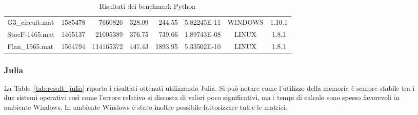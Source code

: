 \documentclass[a4paper, 12pt]{article}
\begin{document}
\begin{table}[h]
{\begin{tabular}{@{}lrrrrrcc@{}}
                    G3\_circuit.mat     & 1585478 & 7660826   & 328.09 & 244.55  & 5.82245E-11 & WINDOWS & 1.10.1 \\
                    StocF-1465.mat      & 1465137 & 21005389  & 376.75 & 739.66  & 1.89743E-08 & LINUX   & 1.8.1  \\
                    Flan\_1565.mat      & 1564794 & 114165372 & 447.43 & 1893.95 & 5.33502E-10 & LINUX   & 1.8.1  \\ \bottomrule
                    \end{tabular}%
                    }
                    \caption{Risultati dei benchmark Python}
                    \label{tab:result_python}
                \end{table}
            
                \subsubsection{Julia}
                La Table~\ref{tab:result_julia} riporta i risultati ottenuti utilizzando Julia. Si può notare come
                l'utilizzo della memoria è sempre stabile tra i due sistemi operativi così come l'errore 
                relativo si discosta di valori poco significativi, ma i tempi di calcolo sono spesso favorevoli in 
                ambiente Windows. In ambiente Windows è stato inoltre possibile fattorizzare tutte le matrici.
\end{document}
